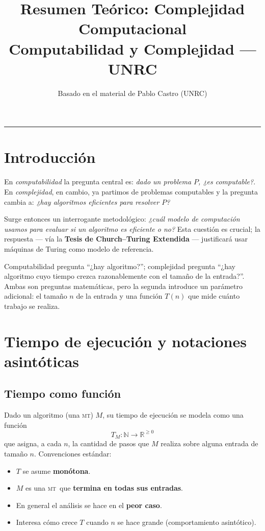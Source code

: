 \documentclass[11pt,a4paper]{article}
\title{\textbf{Resumen Te\'orico: Complejidad Computacional}\\[0.3em]
\large Computabilidad y Complejidad --- UNRC}
\author{Basado en el material de Pablo Castro (UNRC)}
\date{}
\theoremstyle{definicion}
\newcommand{\MT}{\textsc{mt}}
\newcommand{\N}{\mathbb{N}}
\newcommand{\R}{\mathbb{R}}
\begin{document}
\maketitle

\tableofcontents

\vspace{1em}
\hrule
\vspace{1em}

\section{Introducci\'on}

En \emph{computabilidad} la pregunta central es: \emph{dado un problema $P$, ¿es computable?}. En \emph{complejidad}, en cambio, ya partimos de problemas computables y la pregunta cambia a: \emph{¿hay algoritmos eficientes para resolver $P$?}

Surge entonces un interrogante metodol\'ogico: \emph{¿cu\'al modelo de computaci\'on usamos para evaluar si un algoritmo es eficiente o no?} Esta cuesti\'on es crucial; la respuesta --- v\'ia la \textbf{Tesis de Church--Turing Extendida} --- justificar\'a usar m\'aquinas de Turing como modelo de referencia.

\begin{intuicion}
Computabilidad pregunta ``¿hay algoritmo?''; complejidad pregunta ``¿hay algoritmo cuyo tiempo crezca razonablemente con el tama\~no de la entrada?''. Ambas son preguntas matem\'aticas, pero la segunda introduce un par\'ametro adicional: el tama\~no $n$ de la entrada y una funci\'on $T(n)$ que mide cu\'anto trabajo se realiza.
\end{intuicion}

\section{Tiempo de ejecuci\'on y notaciones asint\'oticas}

\subsection{Tiempo como funci\'on}

Dado un algoritmo (una \MT) $M$, su tiempo de ejecuci\'on se modela como una funci\'on
\[
T_M : \N \to \R^{\geq 0}
\]
que asigna, a cada $n$, la cantidad de pasos que $M$ realiza sobre alguna entrada de tama\~no $n$. Convenciones est\'andar:
\begin{itemize}
    \item $T$ se asume \textbf{mon\'otona}.
    \item $M$ es una \MT\ que \textbf{termina en todas sus entradas}.
    \item En general el an\'alisis se hace en el \textbf{peor caso}.
    \item Interesa c\'omo crece $T$ cuando $n$ se hace grande (comportamiento asint\'otico).
\end{itemize}
\end{document}
